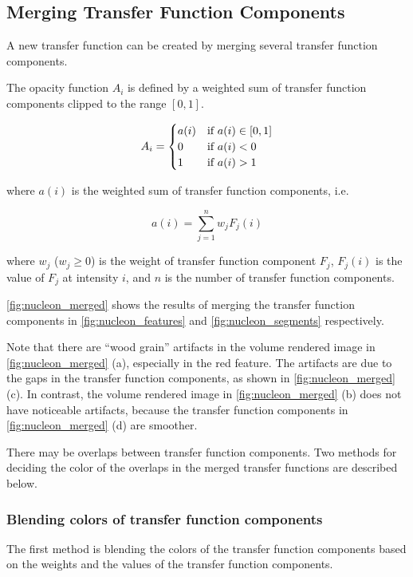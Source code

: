 \documentclass[twoside,twocolumn,10pt]{article}
\begin{document}
\subsection{Merging Transfer Function Components}
A new transfer function can be created by merging several transfer function components.

The opacity function $ A_{i} $ is defined by a weighted sum of transfer function components clipped to the range $ [0,1] $.

\[
A_{i} =
\begin{cases}
a(i) & \text{if $ a(i) \in [0,1] $} \\
0 & \text{if $ a(i)<0 $} \\
1 & \text{if $ a(i)>1 $}
\end{cases}
\]

where $ a(i) $ is the weighted sum of transfer function components, i.e.

\[ 
a(i)=\sum_{j=1}^{n} w_{j}F_{j}(i)
\]

where $ w_{j} $ ($ w_{j} \geq 0 $) is the weight of transfer function component $ F_{j} $, $ F_{j}(i) $ is the value of $ F_{j} $ at intensity $ i $, and $ n $ is the number of transfer function components.

\autoref{fig:nucleon_merged} shows the results of merging the transfer function components in \autoref{fig:nucleon_features} and \autoref{fig:nucleon_segments} respectively.

Note that there are ``wood grain'' artifacts in the volume rendered image in \autoref{fig:nucleon_merged} (a), especially in the red feature. The artifacts are due to the gaps in the transfer function components, as shown in \autoref{fig:nucleon_merged} (c).
In contrast, the volume rendered image in \autoref{fig:nucleon_merged} (b) does not have noticeable artifacts, because the transfer function components in \autoref{fig:nucleon_merged} (d) are smoother.

There may be overlaps between transfer function components. Two methods for deciding the color of the overlaps in the merged transfer functions are described below.

\subsubsection{Blending colors of transfer function components}
The first method is blending the colors of the transfer function components based on the weights and the values of the transfer function components.
\end{document}
